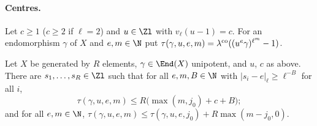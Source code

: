 \paragraph{Centres.} Let $c\ge1$ ($c\ge2$ if $\ell=2$) and $u\in\Zl$ with $v_\ell(u-1)=c$. For an endomorphism $\gamma$ of $X$ and
$e,m\in\N$ put $\tau(\gamma,u,e,m)=\lambda^{\mathrm{co}}((u^e\gamma)^{\ell^m}-1)$.

\begin{lemma}\label{pf:vwin:centres}
Let $X$ be generated by $R$ elements, $\gamma\in\End(X)$ unipotent, and $u$, $c$ as above. There are $s_1,\dots,s_R\in\Zl$ such
that for all $e,m,B\in\N$ with $|s_i-e|_\ell\ge\ell^{-B}$ for all $i$,
\[
 \tau(\gamma,u,e,m)\le R\bigl(\max(m,j_0)+c+B\bigr);
\]
and for all $e,m\in\N$, $\tau(\gamma,u,e,m)\le\tau(\gamma,u,e,j_0)+R\max(m-j_0,0)$.
\end{lemma}

